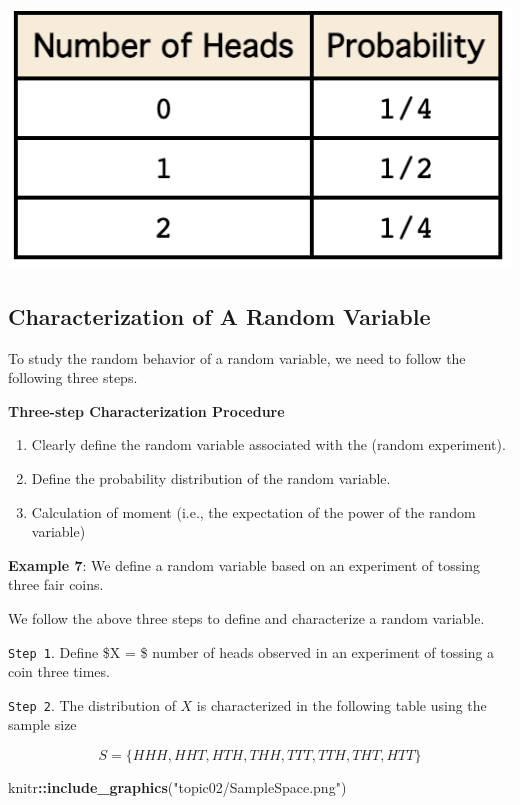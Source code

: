 \documentclass[
]{book}
\newenvironment{Shaded}{\begin{snugshade}}{\end{snugshade}}
\newcommand{\FunctionTok}[1]{\textcolor[rgb]{0.13,0.29,0.53}{\textbf{#1}}}
\newcommand{\NormalTok}[1]{#1}
\newcommand{\SpecialCharTok}[1]{\textcolor[rgb]{0.81,0.36,0.00}{\textbf{#1}}}
\newcommand{\StringTok}[1]{\textcolor[rgb]{0.31,0.60,0.02}{#1}}
\begin{document}
\begin{center}\includegraphics[width=0.3\linewidth]{topic02/tossCoin2ProbDist} \end{center}

\hypertarget{characterization-of-a-random-variable}{%
\subsection{Characterization of A Random Variable}\label{characterization-of-a-random-variable}}

To study the random behavior of a random variable, we need to follow the following three steps.

\textbf{Three-step Characterization Procedure}

\begin{enumerate}
\def\labelenumi{\arabic{enumi}.}
\item
  Clearly define the random variable associated with the (random experiment).
\item
  Define the probability distribution of the random variable.
\item
  Calculation of moment (i.e., the expectation of the power of the random variable)
\end{enumerate}

\textbf{Example 7}: We define a random variable based on an experiment of tossing three fair coins.

We follow the above three steps to define and characterize a random variable.

\texttt{Step\ 1}. Define \$X = \$ number of heads observed in an experiment of tossing a coin three times.

\texttt{Step\ 2}. The distribution of \(X\) is characterized in the following table using the sample size

\[S=\{HHH, HHT, HTH, THH, TTT, TTH, THT, HTT \}\]

\begin{Shaded}
\begin{Highlighting}[]
\NormalTok{knitr}\SpecialCharTok{::}\FunctionTok{include\_graphics}\NormalTok{(}\StringTok{"topic02/SampleSpace.png"}\NormalTok{)}
\end{Highlighting}
\end{Shaded}
\end{document}
